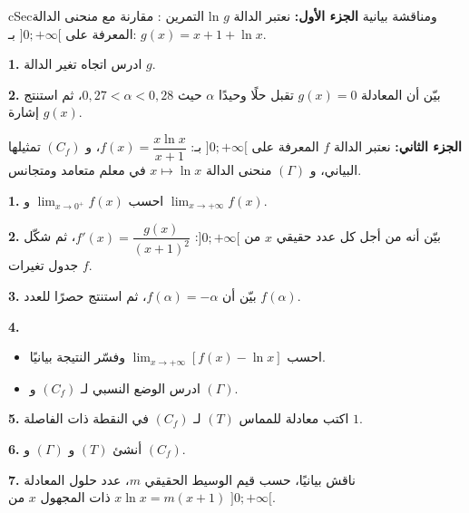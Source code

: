 \documentclass[12pt,a4paper]{article}
\newenvironment{BOX}[2]{\begin{otherlanguage}{english}\begin{arbox}{#1}{#2}}{\end{arbox}\end{otherlanguage}}
\newcounter{exo}
\newenvironment{tamrin}[1]{\stepcounter{exo}\begin{BOX}{cSec}{التمرين \theexo: #1}}{\end{BOX}}
\newenvironment{sq}{\begin{itemize}[leftmargin=2.4em,itemsep=3pt]}{\end{itemize}}
\newcommand{\qa}{\item[(أ)]}\newcommand{\qb}{\item[(ب)]}\newcommand{\qc}{\item[(جـ)]}\newcommand{\qd}{\item[(د)]}\newcommand{\qe}{\item[(هـ)]}
\newcommand{\QQ}[1]{\par\smallskip\textbf{#1.} }
\begin{document}
\begin{tamrin}{مقارنة مع منحنى الدالة ln ومناقشة بيانية}
\textbf{الجزء الأول:} نعتبر الدالة $g$ المعرفة على $]0;+\infty[$ بـ: $g(x)=x+1+\ln x$.
\QQ{1} ادرس اتجاه تغير الدالة $g$.
\QQ{2} بيّن أن المعادلة $g(x)=0$ تقبل حلًا وحيدًا $\alpha$ حيث $0{,}27<\alpha<0{,}28$، ثم استنتج إشارة $g(x)$.

\textbf{الجزء الثاني:} نعتبر الدالة $f$ المعرفة على $]0;+\infty[$ بـ: $f(x)=\dfrac{x\ln x}{x+1}$، و $(C_f)$ تمثيلها البياني، و $(\Gamma)$ منحنى الدالة $x\mapsto\ln x$ في معلم متعامد ومتجانس.
\QQ{1} احسب $\displaystyle\lim_{x\to0^{+}}f(x)$ و $\displaystyle\lim_{x\to+\infty}f(x)$.
\QQ{2} بيّن أنه من أجل كل عدد حقيقي $x$ من $]0;+\infty[$: $f'(x)=\dfrac{g(x)}{(x+1)^2}$، ثم شكّل جدول تغيرات $f$.
\QQ{3} بيّن أن $f(\alpha)=-\alpha$، ثم استنتج حصرًا للعدد $f(\alpha)$.
\QQ{4}
\begin{sq}
\qa احسب $\displaystyle\lim_{x\to+\infty}\left[f(x)-\ln x\right]$ وفسّر النتيجة بيانيًا.
\qb ادرس الوضع النسبي لـ $(C_f)$ و $(\Gamma)$.
\end{sq}
\QQ{5} اكتب معادلة للمماس $(T)$ لـ $(C_f)$ في النقطة ذات الفاصلة $1$.
\QQ{6} أنشئ $(T)$ و $(\Gamma)$ و $(C_f)$.
\QQ{7} ناقش بيانيًا، حسب قيم الوسيط الحقيقي $m$، عدد حلول المعادلة $x\ln x=m(x+1)$ ذات المجهول $x$ من $]0;+\infty[$.
\end{tamrin}
\end{document}
